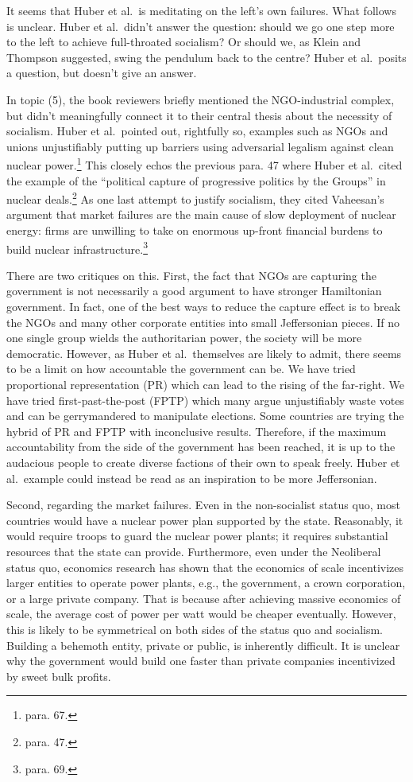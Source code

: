 \documentclass[12pt]{article}
\begin{document}
It seems that Huber et al.\ is meditating on the left's own failures. What follows is unclear. Huber et al.\ didn't answer the question: should we go one step more to the left to achieve full-throated socialism? Or should we, as Klein and Thompson suggested, swing the pendulum back to the centre? Huber et al.\ posits a question, but doesn't give an answer.

In topic (5), the book reviewers briefly mentioned the NGO-industrial complex, but didn't meaningfully connect it to their central thesis about the necessity of socialism. Huber et al.\ pointed out, rightfully so, examples such as NGOs and unions unjustifiably putting up barriers using adversarial legalism against clean nuclear power.\footnote{para. 67.} This closely echos the previous para. 47 where Huber et al.\ cited the example of the ``political capture of progressive politics by the Groups'' in nuclear deals.\footnote{para. 47.} As one last attempt to justify socialism, they cited Vaheesan's argument that market failures are the main cause of slow deployment of nuclear energy: firms are unwilling to take on enormous up-front financial burdens to build nuclear infrastructure.\footnote{para. 69.}

There are two critiques on this. First, the fact that NGOs are capturing the government is not necessarily a good argument to have stronger Hamiltonian government. In fact, one of the best ways to reduce the capture effect is to break the NGOs and many other corporate entities into small Jeffersonian pieces. If no one single group wields the authoritarian power, the society will be more democratic. However, as Huber et al.\ themselves are likely to admit, there seems to be a limit on how accountable the government can be. We have tried proportional representation (PR) which can lead to the rising of the far-right. We have tried first-past-the-post (FPTP) which many argue unjustifiably waste votes and can be gerrymandered to manipulate elections. Some countries are trying the hybrid of PR and FPTP with inconclusive results. Therefore, if the maximum accountability from the side of the government has been reached, it is up to the audacious people to create diverse factions of their own to speak freely. Huber et al.\ example could instead be read as an inspiration to be more Jeffersonian.

Second, regarding the market failures. Even in the non-socialist status quo, most countries would have a nuclear power plan supported by the state. Reasonably, it would require troops to guard the nuclear power plants; it requires substantial resources that the state can provide. Furthermore, even under the Neoliberal status quo, economics research has shown that the economics of scale incentivizes larger entities to operate power plants, e.g., the government, a crown corporation, or a large private company. That is because after achieving massive economics of scale, the average cost of power per watt would be cheaper eventually. However, this is likely to be symmetrical on both sides of the status quo and socialism. Building a behemoth entity, private or public, is inherently difficult. It is unclear why the government would build one faster than private companies incentivized by sweet bulk profits.
\end{document}
